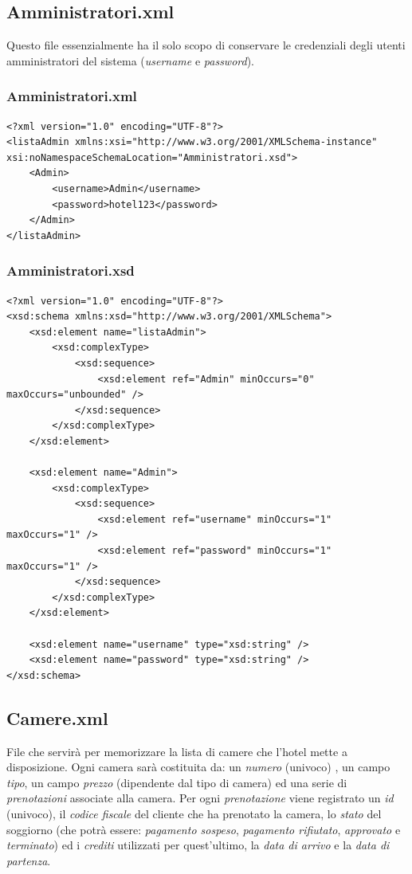 \documentclass [a4paper, 12pt]{book}
\begin{document}
\subsection{Amministratori.xml}
Questo file essenzialmente ha il solo scopo di conservare le credenziali degli utenti amministratori del sistema (\textit{username} e \textit{password}).
\subsubsection{Amministratori.xml}
\begin{lstlisting}[style=XML]
<?xml version="1.0" encoding="UTF-8"?>
<listaAdmin xmlns:xsi="http://www.w3.org/2001/XMLSchema-instance" xsi:noNamespaceSchemaLocation="Amministratori.xsd">
    <Admin>
        <username>Admin</username>
        <password>hotel123</password>
    </Admin>
</listaAdmin> 
\end{lstlisting}
\subsubsection{Amministratori.xsd}
\begin{lstlisting}[style=XML]
<?xml version="1.0" encoding="UTF-8"?>
<xsd:schema xmlns:xsd="http://www.w3.org/2001/XMLSchema">
    <xsd:element name="listaAdmin">
        <xsd:complexType>
            <xsd:sequence>
                <xsd:element ref="Admin" minOccurs="0" maxOccurs="unbounded" />
            </xsd:sequence>
        </xsd:complexType>
    </xsd:element>

    <xsd:element name="Admin">
        <xsd:complexType>
            <xsd:sequence>
                <xsd:element ref="username" minOccurs="1" maxOccurs="1" />
                <xsd:element ref="password" minOccurs="1" maxOccurs="1" />
            </xsd:sequence>
        </xsd:complexType>
    </xsd:element>

    <xsd:element name="username" type="xsd:string" />
    <xsd:element name="password" type="xsd:string" />
</xsd:schema>
\end{lstlisting}
\subsection{Camere.xml}
File che servirà per memorizzare la lista di camere che l'hotel mette a disposizione. Ogni camera sarà costituita da: un \textit{numero} (univoco) , un campo \textit{tipo}, un campo \textit{prezzo} (dipendente dal tipo di camera) ed una serie di \textit{prenotazioni} associate alla camera. Per ogni \textit{prenotazione} viene registrato un \textit{id} (univoco), il \textit{codice fiscale} del cliente che ha prenotato la camera, lo \textit{stato} del soggiorno (che potrà essere: \textit{pagamento sospeso}, \textit{pagamento rifiutato}, \textit{approvato} e \textit{terminato}) ed i \textit{crediti} utilizzati per quest'ultimo, la \textit{data di arrivo} e la \textit{data di partenza}.
\end{document}
